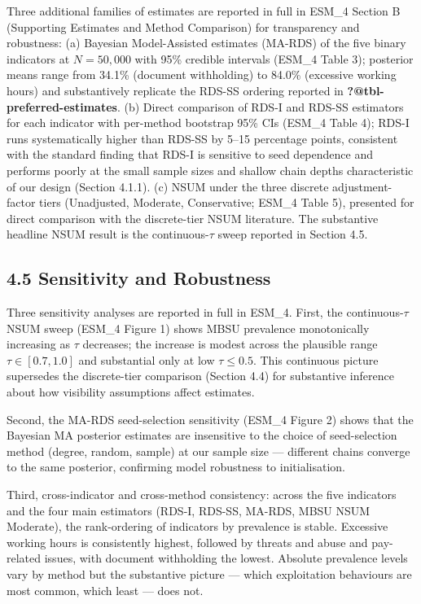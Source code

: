 \documentclass[
  12pt,
  letterpaper,
  DIV=11,
  numbers=noendperiod]{scrartcl}
\begin{document}
Three additional families of estimates are reported in full in ESM\_4
Section B (Supporting Estimates and Method Comparison) for transparency
and robustness: (a) Bayesian Model-Assisted estimates (MA-RDS) of the
five binary indicators at \(N = 50{,}000\) with 95\% credible intervals
(ESM\_4 Table 3); posterior means range from 34.1\% (document
withholding) to 84.0\% (excessive working hours) and substantively
replicate the RDS-SS ordering reported in
\textbf{?@tbl-preferred-estimates}. (b) Direct comparison of RDS-I and
RDS-SS estimators for each indicator with per-method bootstrap 95\% CIs
(ESM\_4 Table 4); RDS-I runs systematically higher than RDS-SS by 5--15
percentage points, consistent with the standard finding that RDS-I is
sensitive to seed dependence and performs poorly at the small sample
sizes and shallow chain depths characteristic of our design (Section
4.1.1). (c) NSUM under the three discrete adjustment-factor tiers
(Unadjusted, Moderate, Conservative; ESM\_4 Table 5), presented for
direct comparison with the discrete-tier NSUM literature. The
substantive headline NSUM result is the continuous-\(\tau\) sweep
reported in Section 4.5.

\subsection{4.5 Sensitivity and
Robustness}\label{sensitivity-and-robustness}

Three sensitivity analyses are reported in full in ESM\_4. First, the
continuous-\(\tau\) NSUM sweep (ESM\_4 Figure 1) shows MBSU prevalence
monotonically increasing as \(\tau\) decreases; the increase is modest
across the plausible range \(\tau \in [0.7, 1.0]\) and substantial only
at low \(\tau \le 0.5\). This continuous picture supersedes the
discrete-tier comparison (Section 4.4) for substantive inference about
how visibility assumptions affect estimates.

Second, the MA-RDS seed-selection sensitivity (ESM\_4 Figure 2) shows
that the Bayesian MA posterior estimates are insensitive to the choice
of seed-selection method (degree, random, sample) at our sample size ---
different chains converge to the same posterior, confirming model
robustness to initialisation.

Third, cross-indicator and cross-method consistency: across the five
indicators and the four main estimators (RDS-I, RDS-SS, MA-RDS, MBSU
NSUM Moderate), the rank-ordering of indicators by prevalence is stable.
Excessive working hours is consistently highest, followed by threats and
abuse and pay-related issues, with document withholding the lowest.
Absolute prevalence levels vary by method but the substantive picture
--- which exploitation behaviours are most common, which least --- does
not.
\end{document}
